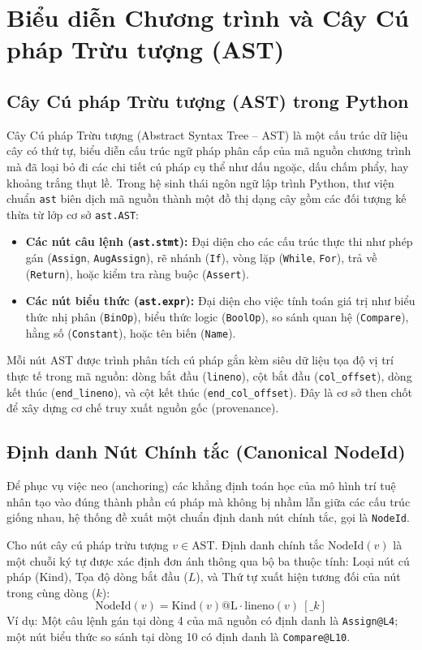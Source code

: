 \section{Biểu diễn Chương trình và Cây Cú pháp Trừu tượng (AST)}
\label{sec:ast_and_ssa}

\subsection{Cây Cú pháp Trừu tượng (AST) trong Python}
Cây Cú pháp Trừu tượng (Abstract Syntax Tree -- AST) là một cấu trúc dữ liệu cây có thứ tự, biểu diễn cấu trúc ngữ pháp phân cấp của mã nguồn chương trình mà đã loại bỏ đi các chi tiết cú pháp cụ thể như dấu ngoặc, dấu chấm phẩy, hay khoảng trắng thụt lề. Trong hệ sinh thái ngôn ngữ lập trình Python, thư viện chuẩn \texttt{ast} biên dịch mã nguồn thành một đồ thị dạng cây gồm các đối tượng kế thừa từ lớp cơ sở \texttt{ast.AST}:
\begin{itemize}
    \item \textbf{Các nút câu lệnh (\texttt{ast.stmt}):} Đại diện cho các cấu trúc thực thi như phép gán (\texttt{Assign}, \texttt{AugAssign}), rẽ nhánh (\texttt{If}), vòng lặp (\texttt{While}, \texttt{For}), trả về (\texttt{Return}), hoặc kiểm tra ràng buộc (\texttt{Assert}).
    \item \textbf{Các nút biểu thức (\texttt{ast.expr}):} Đại diện cho việc tính toán giá trị như biểu thức nhị phân (\texttt{BinOp}), biểu thức logic (\texttt{BoolOp}), so sánh quan hệ (\texttt{Compare}), hằng số (\texttt{Constant}), hoặc tên biến (\texttt{Name}).
\end{itemize}

Mỗi nút AST được trình phân tích cú pháp gắn kèm siêu dữ liệu tọa độ vị trí thực tế trong mã nguồn: dòng bắt đầu (\texttt{lineno}), cột bắt đầu (\texttt{col\_offset}), dòng kết thúc (\texttt{end\_lineno}), và cột kết thúc (\texttt{end\_col\_offset}). Đây là cơ sở then chốt để xây dựng cơ chế truy xuất nguồn gốc (provenance).

\subsection{Định danh Nút Chính tắc (Canonical NodeId)}
Để phục vụ việc neo (anchoring) các khẳng định toán học của mô hình trí tuệ nhân tạo vào đúng thành phần cú pháp mà không bị nhầm lẫn giữa các cấu trúc giống nhau, hệ thống đề xuất một chuẩn định danh nút chính tắc, gọi là \texttt{NodeId}.

\begin{definition}
Cho nút cây cú pháp trừu tượng $v \in \text{AST}$. Định danh chính tắc $\text{NodeId}(v)$ là một chuỗi ký tự được xác định đơn ánh thông qua bộ ba thuộc tính: Loại nút cú pháp ($\text{Kind}$), Tọa độ dòng bắt đầu ($L$), và Thứ tự xuất hiện tương đối của nút trong cùng dòng ($k$):
\begin{equation}
\text{NodeId}(v) = \text{Kind}(v) \text{@L} \cdot \text{lineno}(v) \ [\_k]
\end{equation}
Ví dụ: Một câu lệnh gán tại dòng 4 của mã nguồn có định danh là \texttt{Assign@L4}; một nút biểu thức so sánh tại dòng 10 có định danh là \texttt{Compare@L10}.
\end{definition}

